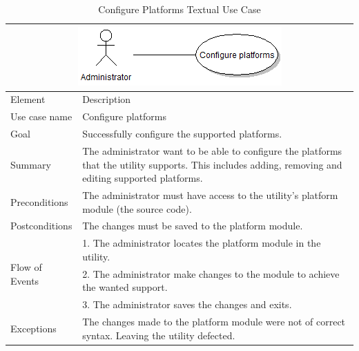 \begin{table}[htbp] \footnotesize \center
\caption{Configure Platforms Textual Use Case\label{tab:textual:configureplatforms}}
\begin{tabularx}{\textwidth}{l X}
	\multicolumn{2}{c}{\includegraphics[scale=0.8]{./planning/img/uc_configureplatform}} \\
	\toprule
	Element & Description\\
	\midrule
	Use case name & Configure platforms\\
	Goal & Successfully configure the supported platforms.\\
	Summary & The administrator want to be able to configure the platforms that the utility supports. This includes adding, removing and editing supported platforms.\\
	Preconditions & The administrator must have access to the utility's platform module (the source code).\\
	Postconditions & The changes must be saved to the platform module.\\
	\midrule
	\multirow{3}{*}{Flow of Events} & 1. The administrator locates the platform module in the utility. \\
	& 2. The administrator make changes to the module to achieve the wanted support.\\
	& 3. The administrator saves the changes and exits. \\
	\midrule
	Exceptions & The changes made to the platform module were not of correct syntax. Leaving the utility defected. \\
	\bottomrule
\end{tabularx}
\end{table}

